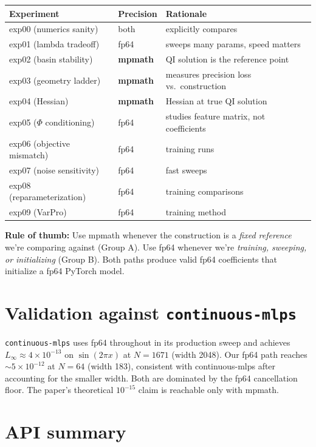 \documentclass[11pt]{article}
\begin{document}
\begin{center}
\begin{tabular}{lll}
\toprule
Experiment & Precision & Rationale \\
\midrule
exp00 (numerics sanity) & both & explicitly compares \\
exp01 (lambda tradeoff) & fp64 & sweeps many params, speed matters \\
exp02 (basin stability) & \textbf{mpmath} & QI solution is the reference point \\
exp03 (geometry ladder) & \textbf{mpmath} & measures precision loss vs.\ construction \\
exp04 (Hessian) & \textbf{mpmath} & Hessian at true QI solution \\
exp05 ($\Phi$ conditioning) & fp64 & studies feature matrix, not coefficients \\
exp06 (objective mismatch) & fp64 & training runs \\
exp07 (noise sensitivity) & fp64 & fast sweeps \\
exp08 (reparameterization) & fp64 & training comparisons \\
exp09 (VarPro) & fp64 & training method \\
\bottomrule
\end{tabular}
\end{center}

\textbf{Rule of thumb:} Use mpmath whenever the construction is a \emph{fixed reference} we're
comparing against (Group A). Use fp64 whenever we're \emph{training, sweeping, or initializing}
(Group B). Both paths produce valid fp64 coefficients that initialize a fp64 PyTorch model.

\section{Validation against \texttt{continuous-mlps}}

\texttt{continuous-mlps} uses fp64 throughout in its production sweep and achieves
$L_\infty \approx 4\times 10^{-13}$ on $\sin(2\pi x)$ at $N=1671$ (width 2048). Our fp64 path
reaches $\sim 5\times 10^{-12}$ at $N=64$ (width 183), consistent with continuous-mlps after
accounting for the smaller width. Both are dominated by the fp64 cancellation floor. The
paper's theoretical $10^{-15}$ claim is reachable only with mpmath.

\section{API summary}
\end{document}
